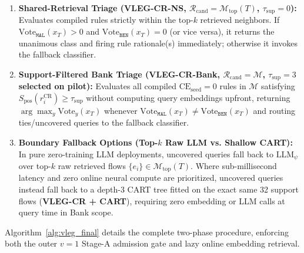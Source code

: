 \documentclass[11pt,letterpaper,onecolumn]{article}
\begin{document}
\begin{enumerate}[leftmargin=1.8em,topsep=2pt,itemsep=2pt]
    \item \textbf{Shared-Retrieval Triage (VLEG-CR-NS, $\mathcal{R}_{\mathrm{cand}} = \mathcal{M}_{\mathrm{top}}(T)$, $\tau_{\mathrm{sup}}=0$):} Evaluates compiled rules strictly within the top-$k$ retrieved neighbors. If $\mathrm{Vote}_{\texttt{MAL}}(x_T) > 0$ and $\mathrm{Vote}_{\texttt{BEN}}(x_T) = 0$ (or vice versa), it returns the unanimous class and firing rule rationale(s) immediately; otherwise it invokes the fallback classifier.
    \item \textbf{Support-Filtered Bank Triage (VLEG-CR-Bank, $\mathcal{R}_{\mathrm{cand}} = \mathcal{M}$, $\tau_{\mathrm{sup}}=3$ selected on pilot):} Evaluates all compiled $\mathrm{CE}_{\mathrm{seed}}=0$ rules in $\mathcal{M}$ satisfying $S_{\mathrm{pos}}(r_i^{\mathrm{CR}}) \ge \tau_{\mathrm{sup}}$ without computing query embeddings upfront, returning $\arg\max_y \mathrm{Vote}_y(x_T)$ whenever $\mathrm{Vote}_{\texttt{MAL}}(x_T) \neq \mathrm{Vote}_{\texttt{BEN}}(x_T)$ and routing ties/uncovered queries to the fallback classifier.
    \item \textbf{Boundary Fallback Options (Top-$k$ Raw LLM vs. Shallow CART):} In pure zero-training LLM deployments, uncovered queries fall back to $\mathrm{LLM}_\psi$ over top-$k$ raw retrieved flows $\{e_i\} \in \mathcal{M}_{\mathrm{top}}(T)$. Where sub-millisecond latency and zero online neural compute are prioritized, uncovered queries instead fall back to a depth-3 CART tree fitted on the exact same 32 support flows (\textbf{VLEG-CR + CART}), requiring zero embedding or LLM calls at query time in Bank scope.
\end{enumerate}

Algorithm~\ref{alg:vleg_final} details the complete two-phase procedure, enforcing both the outer $v = 1$ Stage-A admission gate and lazy online embedding retrieval.
\end{document}
